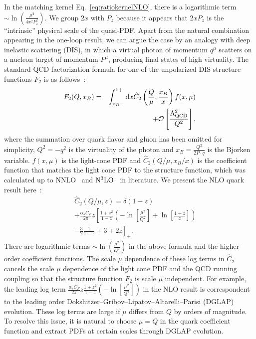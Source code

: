 \documentclass[prd,aps,twocolumn,preprintnumbers, showpacs, nofootinbib,superscriptaddress,notitlepage]{revtex4-2}
\def\bea{\begin{eqnarray}}
\def\eea{\end{eqnarray}}
\begin{document}
In the matching kernel Eq.~\eqref{eq:ratiokernelNLO}, there is a logarithmic term $\sim \ln \left(\frac{\mu^2}{4 x^2 P_z^2} \right)$. We group $2x$ with $P_z$ because it appears that $2 x P_{z}$ is the ``intrinsic'' physical scale of the quasi-PDF. Apart from the natural combination appearing in the one-loop result, we can argue the case by an analogy with deep inelastic scattering (DIS), in which a virtual photon of momentum $q^\mu$ scatters on a nucleon target of momentum $P^\mu$, producing final states of high virtuality. The standard QCD factorization formula for one of the unpolarized DIS structure functions $F_2$ is as follows~\cite{Collins:2011zzd}:
\bea\label{eq:DISfact}
F_2(Q,x_B)=&&\int_{x_B -}^{1+} \mathrm{d} x \hat{C}_{2}\left(\frac{Q}{\mu}, \frac{x_B}{x}\right) f(x,\mu) \nonumber\\
&&+ {\cal O}\left[\frac{\Lambda_{\rm QCD}^2}{Q^2}\right],
\eea
where the summation over quark flavor and gluon has been omitted for simplicity, $Q^2=-q^2$ is the virtuality of the photon and $x_B = \frac{Q^2}{2 P \cdot q}$ is the Bjorken variable. $f(x,\mu)$ is the light-cone PDF and $\hat{C}_{2}\left(Q / \mu, x_B / x\right)$ is the coefficient function that matches the light cone PDF to the structure function, which was calculated up to NNLO~\cite{Zijlstra:1992qd,Moch:1999eb} and ${\rm N^{3}LO}$~\cite{Vermaseren:2005qc} in literature. We present the NLO quark result here~\cite{Collins:2011zzd}: 
\bea
&&\hat{C}_{2}(Q/\mu,z) = \delta(1-z) \nonumber\\
&&+ \frac{\alpha_s C_F}{2 \pi} z \left[\frac{1+z^2}{1-z}\left(-\ln \left[\frac{\mu^2}{Q^2}\right]+\ln \left[\frac{1-z}{z}\right]\right) \right. \nonumber\\
&&\left.-\frac{3}{2}\frac{1}{1-z}+3+2 z\right]_{+}.
\eea
There are logarithmic terms $\sim \ln(\frac{\mu^2}{Q^2})$ in the above formula and the higher-order coefficient functions. The scale $\mu$ dependence of these log terms in $\hat{C}_{2}$ cancels the scale $\mu$ dependence of the light cone PDF and the QCD running coupling so that the structure function $F_{2}$ is scale $\mu$ independent. For example, the leading log term $\frac{\alpha_s C_F}{2 \pi} z \frac{1+z^2}{1-z}\left(-\ln \left[\frac{\mu^2}{Q^2}\right]\right)$ in the NLO result is correspondent to the leading order Dokshitzer–Gribov–Lipatov–Altarelli–Parisi (DGLAP) evolution. These log terms are large if $\mu$ differs from $Q$ by orders of magnitude. To resolve this issue, it is natural to choose $\mu=Q$ in the quark coefficient function and extract PDFs at certain scales through DGLAP evolution.
\end{document}
